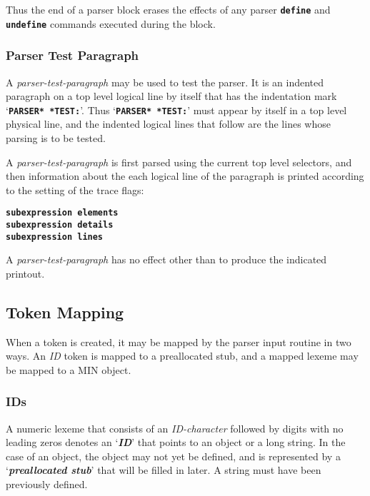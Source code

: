 \documentclass[12pt]{article}
\newcommand{\TT}[1]{{\tt \bfseries #1}}
\newcommand{\key}[1]{{\bf \em #1}\index{#1}}
\begin{document}
Thus the end of a parser block erases the effects of any
parser \TT{define} and \TT{undefine} commands executed during the block.

\subsubsection{Parser Test Paragraph}
\label{PARSER-TEST-PARAGRAPH}

A {\em parser-test-paragraph} may be used to test the parser.
It is an indented paragraph on a top level logical line by itself
that has the indentation mark `\TT{*PARSER* *TEST:}'.
Thus `\TT{*PARSER* *TEST:}' must appear by itself in a top level
physical line, and the indented logical lines that follow are the
lines whose parsing is to be tested.

A {\em parser-test-paragraph} is first parsed using the current top
level selectors, and then information about the each logical line
of the paragraph is printed according to the setting of the
trace flags:
\begin{center}
\TT{subexpression elements} \\
\TT{subexpression details} \\
\TT{subexpression lines} \\
\end{center}

A {\em parser-test-paragraph} has no effect other than to produce
the indicated printout.

\subsection{Token Mapping}

When a token is created, it may be mapped by the parser input
routine in two ways.  An {\em ID} token is mapped to a preallocated
stub, and a mapped lexeme may be mapped to a MIN object.

\subsubsection{IDs}
\label{IDS}

A numeric lexeme that consists of an {\em ID-character}
followed by digits with no leading zeros denotes an `\key{ID}'
that points to an object or a long string.  In the case of an object,
the object may not yet be defined, and is represented by
a `\key{preallocated stub}' that will be filled in later.
A string must have been previously defined.
\end{document}
